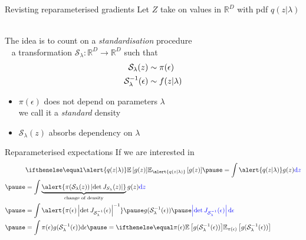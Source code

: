 \documentclass[14pt]{beamer}
\begin{document}
\begin{frame}{Revisting reparameterised gradients}
	Let $Z$ take on values in $\mathbb R^D$ with pdf $q(z|\lambda)$ \\
	
	~ \pause

	The idea is to count on a \emph{standardisation} procedure\\ \pause
	~ a transformation $\mathcal S_\lambda: \mathbb R^D \to \mathbb R^D$ such that \pause
	\begin{equation*}
	\begin{aligned}
	\mathcal S_\lambda(z) &\sim \pi(\epsilon) \\
 	{\mathcal S}^{-1}_\lambda(\epsilon) &\sim f(z|\lambda)
	\end{aligned}
	\end{equation*} 
	\begin{itemize}
		\item $\pi(\epsilon)$ does not depend on parameters $\lambda$\\
		we call it a \emph{standard} density \pause
		\item $\mathcal S_\lambda(z)$ absorbs dependency on $\lambda$ 
	\end{itemize}

\end{frame}

\begin{frame}{Reparameterised expectations}
	If we are interested in 
	\begin{equation*}
	\begin{aligned}
		&  \E[\alert{q(z|\lambda)}]{g(z)} \pause = \int \alert{q(z|\lambda)} g(z) \textcolor{blue}{\dd z} \\ \pause
		&= \int \underbrace{\alert{\pi(\mathcal S_\lambda(z)) \djac{S_\lambda}{z}}}_{\text{change of density}} g(z) \textcolor{blue}{\dd z} \\ \pause
		&= \int \alert{\pi(\epsilon) \djac{\inv{\mathcal S}_\lambda}{\epsilon}^{-1}} \pause g(\inv{\mathcal S}_\lambda(\epsilon)) \pause \textcolor{blue}{\djac{\inv{\mathcal S}_\lambda}{\epsilon} \dd \epsilon} \\ \pause
		&= \int \pi(\epsilon) g(\inv{\mathcal S}_\lambda(\epsilon))\dd \epsilon \pause = \E[\pi(\epsilon)]{g(\inv{\mathcal S}_\lambda(\epsilon)) }
	\end{aligned}
	\end{equation*}
\end{frame}
\end{document}
